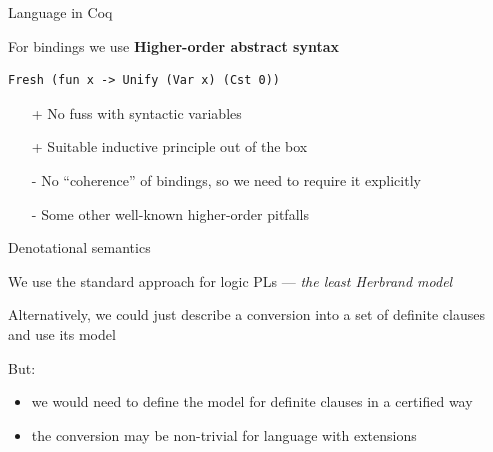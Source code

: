 \documentclass{beamer}
\theoremstyle{definition}
\theoremstyle{plain} %
\begin{document}
\begin{frame}[fragile]{Language in Coq}

For bindings we use \textbf{Higher-order abstract syntax}

\begin{lstlisting}
Fresh (fun x -> Unify (Var x) (Cst 0))
\end{lstlisting}

\vskip5mm

\begin{itemize}
\item[+] No fuss with syntactic variables
\item[+] Suitable inductive principle out of the box
\item[-] No ``coherence'' of bindings, so we need to require it explicitly
\item[-] Some other well-known higher-order pitfalls
\end{itemize}

\end{frame}



\begin{frame}{Denotational semantics}

We use the standard approach for logic PLs --- \emph{the least Herbrand model}

\vskip10mm

Alternatively, we could just describe a conversion into a set of definite clauses and use its model

\vskip5mm

But:

\begin{itemize}
\item we would need to define the model for definite clauses in a certified way
\item the conversion may be non-trivial for language with extensions
\end{itemize}

\end{frame}
\end{document}
